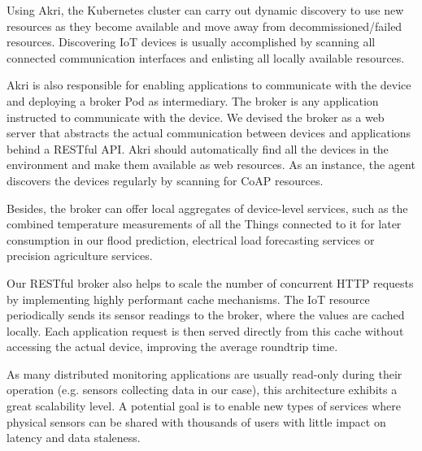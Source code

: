 Using Akri, the Kubernetes cluster can carry out dynamic discovery to use new resources as they become available and move away from decommissioned/failed resources. Discovering IoT devices is usually accomplished by scanning all connected communication interfaces and enlisting all locally available resources.

Akri is also responsible for enabling applications to communicate with the device and deploying a broker Pod as intermediary. The broker is any application instructed to communicate with the device. We devised the broker as a web server that abstracts the actual communication between devices and applications behind a RESTful API. Akri should automatically find all the devices in the environment and make them available as web resources. As an instance, the agent discovers the devices regularly by scanning for CoAP resources.

Besides, the broker can offer local aggregates of device-level services, such as the combined temperature measurements of all the Things connected to it for later consumption in our flood prediction, electrical load forecasting services or precision agriculture services.

Our RESTful broker also helps to scale the number of concurrent HTTP requests by implementing highly performant cache mechanisms. The IoT resource periodically sends its sensor readings to the broker, where the values are cached locally. Each application request is then served directly from this cache without accessing the actual device, improving the average roundtrip time.


As many distributed monitoring applications are usually read-only during their operation (e.g. sensors collecting data in our case), this architecture exhibits a great scalability level. A potential goal is to enable new types of services where physical sensors can be shared with thousands of users with little impact on latency and data staleness.

